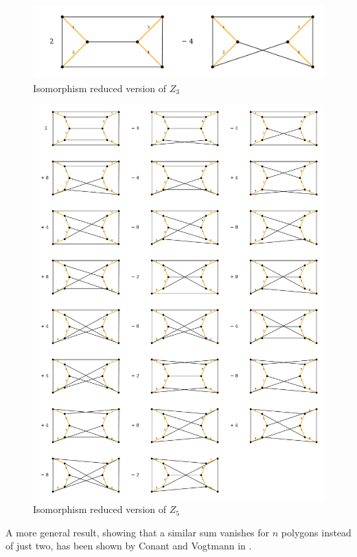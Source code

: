 \begin{figure}[h]
	\centering
	\includegraphics[width=\textwidth]{./ForestedGraphs/MCCycle3.pdf}
	\caption{Isomorphism reduced version of $Z_3$}
	\label{fig:Z3}
\end{figure}
\begin{figure}[p]
	\centering
	\includegraphics[width=\textwidth]{./ForestedGraphs/MCCycle5.pdf}
	\caption{Isomorphism reduced version of $Z_5$}
	\label{fig:Z5}
\end{figure}

A more general result, showing that a similar sum vanishes for $n$ polygons instead of just two,
has been shown by Conant and Vogtmann in \cite{conant08}.

